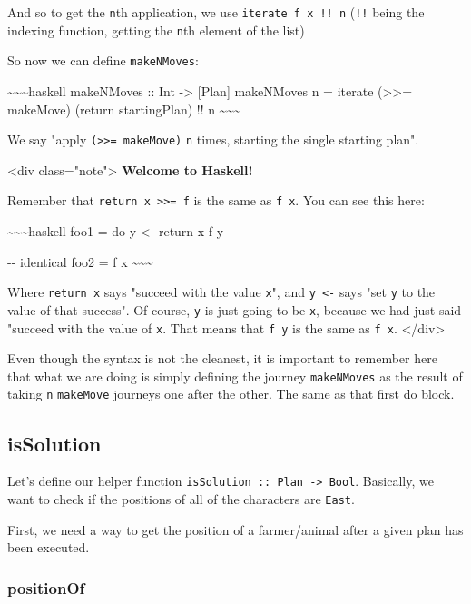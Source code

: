 \documentclass[]{article}
\begin{document}
And so to get the \texttt{n}th application, we use \texttt{iterate\ f\ x\ !!\ n}
(\texttt{!!} being the indexing function, getting the \texttt{n}th element of
the list)

So now we can define \texttt{makeNMoves}:

\textasciitilde{}\textasciitilde{}\textasciitilde{}haskell makeNMoves :: Int
-\textgreater{} {[}Plan{]} makeNMoves n = iterate (\textgreater{}\textgreater{}=
makeMove) (return startingPlan) !! n
\textasciitilde{}\textasciitilde{}\textasciitilde{}

We say "apply \texttt{(\textgreater{}\textgreater{}=\ makeMove)} \texttt{n}
times, starting the single starting plan".

\textless{}div class="note"\textgreater{} \textbf{Welcome to Haskell!}

Remember that \texttt{return\ x\ \textgreater{}\textgreater{}=\ f} is the same
as \texttt{f\ x}. You can see this here:

\textasciitilde{}\textasciitilde{}\textasciitilde{}haskell foo1 = do y
\textless{}- return x f y

-\/- identical foo2 = f x \textasciitilde{}\textasciitilde{}\textasciitilde{}

Where \texttt{return\ x} says "succeed with the value \texttt{x}", and
\texttt{y\ \textless{}-} says "set \texttt{y} to the value of that success". Of
course, \texttt{y} is just going to be \texttt{x}, because we had just said
"succeed with the value of \texttt{x}. That means that \texttt{f\ y} is the same
as \texttt{f\ x}. \textless{}/div\textgreater{}

Even though the syntax is not the cleanest, it is important to remember here
that what we are doing is simply defining the journey \texttt{makeNMoves} as the
result of taking \texttt{n} \texttt{makeMove} journeys one after the other. The
same as that first do block.

\subsection{isSolution}

Let's define our helper function
\texttt{isSolution\ ::\ Plan\ -\textgreater{}\ Bool}. Basically, we want to
check if the positions of all of the characters are \texttt{East}.

First, we need a way to get the position of a farmer/animal after a given plan
has been executed.

\subsubsection{positionOf}
\end{document}
